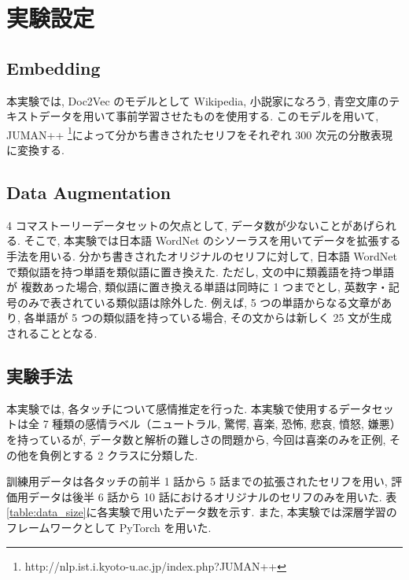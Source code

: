 \documentclass[twocolumn]{jarticle}     %
\begin{document}
\section{実験設定}
\subsection{Embedding}
本実験では, Doc2Vec のモデルとして Wikipedia, 小説家になろう, 青空文庫のテキストデータを用いて事前学習させたものを使用する.
このモデルを用いて, JUMAN++ \footnote{http://nlp.ist.i.kyoto-u.ac.jp/index.php?JUMAN++}によって分かち書きされたセリフをそれぞれ 300 次元の分散表現に変換する.

\subsection{Data Augmentation}
4 コマストーリーデータセットの欠点として, データ数が少ないことがあげられる. そこで, 本実験では日本語 WordNet \cite{word_net_jp}のシソーラスを用いてデータを拡張する手法を用いる.
分かち書きされたオリジナルのセリフに対して, 日本語 WordNet で類似語を持つ単語を類似語に置き換えた. ただし, 文の中に類義語を持つ単語が
複数あった場合, 類似語に置き換える単語は同時に 1 つまでとし, 英数字・記号のみで表されている類似語は除外した. 例えば, 5 つの単語からなる文章があり,
各単語が 5 つの類似語を持っている場合, その文からは新しく 25 文が生成されることとなる.

\subsection{実験手法}
本実験では, 各タッチについて感情推定を行った.
本実験で使用するデータセットは全 7 種類の感情ラベル（ニュートラル, 驚愕, 喜楽, 恐怖, 悲哀, 憤怒, 嫌悪）
を持っているが, データ数と解析の難しさの問題から, 今回は喜楽のみを正例, その他を負例とする 2 クラスに分類した.

訓練用データは各タッチの前半 1 話から 5 話までの拡張されたセリフを用い,
評価用データは後半 6 話から 10 話におけるオリジナルのセリフのみを用いた.
表\ref{table:data_size}に各実験で用いたデータ数を示す.
また, 本実験では深層学習のフレームワークとして PyTorch を用いた.
\end{document}
